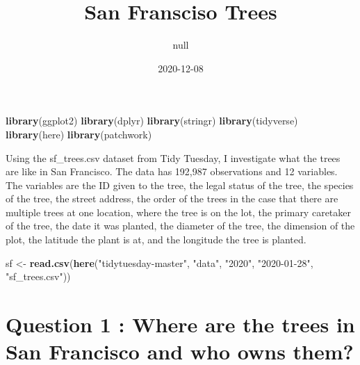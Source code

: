 \documentclass[
]{article}
\title{San Fransciso Trees}
\author{null}
\date{2020-12-08}
\newenvironment{Shaded}{\begin{snugshade}}{\end{snugshade}}
\newcommand{\KeywordTok}[1]{\textcolor[rgb]{0.13,0.29,0.53}{\textbf{#1}}}
\newcommand{\NormalTok}[1]{#1}
\newcommand{\StringTok}[1]{\textcolor[rgb]{0.31,0.60,0.02}{#1}}
\begin{document}
\maketitle

\begin{Shaded}
\begin{Highlighting}[]
\KeywordTok{library}\NormalTok{(ggplot2)}
\KeywordTok{library}\NormalTok{(dplyr)}
\KeywordTok{library}\NormalTok{(stringr)}
\KeywordTok{library}\NormalTok{(tidyverse)}
\KeywordTok{library}\NormalTok{(here)}
\KeywordTok{library}\NormalTok{(patchwork)}
\end{Highlighting}
\end{Shaded}

Using the sf\_trees.csv dataset from Tidy Tuesday, I investigate what
the trees are like in San Francisco. The data has 192,987 observations
and 12 variables. The variables are the ID given to the tree, the legal
status of the tree, the species of the tree, the street address, the
order of the trees in the case that there are multiple trees at one
location, where the tree is on the lot, the primary caretaker of the
tree, the date it was planted, the diameter of the tree, the dimension
of the plot, the latitude the plant is at, and the longitude the tree is
planted.

\begin{Shaded}
\begin{Highlighting}[]
\NormalTok{sf <-}\StringTok{ }\KeywordTok{read.csv}\NormalTok{(}\KeywordTok{here}\NormalTok{(}\StringTok{"tidytuesday-master"}\NormalTok{, }\StringTok{"data"}\NormalTok{, }\StringTok{"2020"}\NormalTok{, }\StringTok{"2020-01-28"}\NormalTok{, }\StringTok{"sf_trees.csv"}\NormalTok{))}
\end{Highlighting}
\end{Shaded}

\hypertarget{question-1-where-are-the-trees-in-san-francisco-and-who-owns-them}{%
\section{Question 1 : Where are the trees in San Francisco and who owns
them?}\label{question-1-where-are-the-trees-in-san-francisco-and-who-owns-them}}
\end{document}

